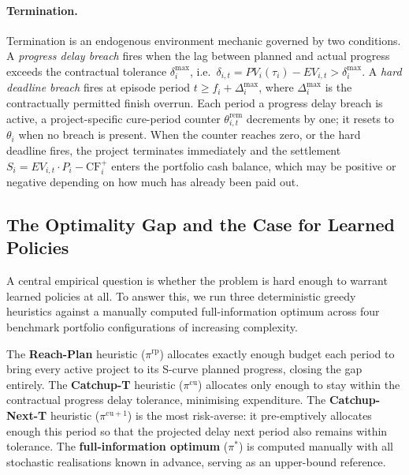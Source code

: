 \paragraph{Termination.}
Termination is an endogenous environment mechanic governed by two conditions.
A \emph{progress delay breach} fires when the lag between planned and actual
progress exceeds the contractual tolerance $\delta^{\max}_i$, i.e.\
$\delta_{i,t} = PV_i(\tau_i) - EV_{i,t} > \delta^{\max}_i$.
A \emph{hard deadline breach} fires at episode period $t \geq f_i +
\Delta^{\max}_i$, where $\Delta^{\max}_i$ is the contractually permitted
finish overrun.  Each period a progress delay breach is active, a
project-specific cure-period counter $\theta^{\mathrm{rem}}_{i,t}$ decrements
by one; it resets to $\theta_i$ when no breach is present.  When the counter
reaches zero, or the hard deadline fires, the project terminates immediately
and the settlement $S_i = EV_{i,t} \cdot P_i - \mathrm{CF}^{+}_{i}$ enters
the portfolio cash balance, which may be positive or negative depending on
how much has already been paid out.

\subsection{The Optimality Gap and the Case for Learned Policies}
\label{subsec:gap}

A central empirical question is whether the problem is hard enough to warrant
learned policies at all.  To answer this, we run three deterministic greedy
heuristics against a manually computed full-information optimum across four
benchmark portfolio configurations of increasing complexity.

The \textbf{Reach-Plan} heuristic ($\pi^{\mathrm{rp}}$) allocates exactly
enough budget each period to bring every active project to its S-curve planned
progress, closing the gap entirely.  The \textbf{Catchup-T} heuristic
($\pi^{\mathrm{cu}}$) allocates only enough to stay within the contractual
progress delay tolerance, minimising expenditure.  The \textbf{Catchup-Next-T}
heuristic ($\pi^{\mathrm{cu}+1}$) is the most risk-averse: it pre-emptively
allocates enough this period so that the projected delay next period also
remains within tolerance.  The \textbf{full-information optimum}
($\pi^{*}$) is computed manually with all stochastic realisations known in
advance, serving as an upper-bound reference.

